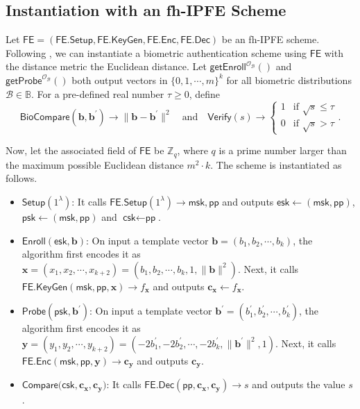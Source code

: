 
\subsection{Instantiation with an fh-IPFE Scheme}
\label{sec:fh-IPFE-instantiation}

Let $\textsf{FE} = (\textsf{FE.Setup}, \textsf{FE.KeyGen}, \textsf{FE.Enc}, \textsf{FE.Dec})$ be an fh-IPFE scheme. Following \cite{cryptoeprint:2023/481}, we can instantiate a biometric authentication scheme using $\textsf{FE}$ with the distance metric the Euclidean distance.
Let $\textsf{getEnroll}^{\mathcal{O}_{\mathcal{B}}}()$ and $\textsf{getProbe}^{\mathcal{O}_{\mathcal{B}}}()$ both output vectors in $ \{0, 1, \cdots, m \}^k$ for all biometric distributions $\mathcal{B} \in \mathbb{B}$. 
For a pre-defined real number $\tau \geq 0$, define
\[
	\textsf{BioCompare}(\mathbf{b}, \mathbf{b}^\prime) \to \| \mathbf{b} - \mathbf{b}^\prime\|^2 \quad \text{and} \quad 
	\textsf{Verify}(s) \to 
	\begin{cases} 
		1 & \text{if } \sqrt{s} \leq \tau \\
		0 & \text{if } \sqrt{s} > \tau
	\end{cases}.
\]

Now, let the associated field of $\textsf{FE}$ be $\mathbb{Z}_q$, where $q$ is a prime number larger than the maximum possible Euclidean distance $m^2 \cdot k$. The scheme is instantiated as follows.

\begin{itemize}

	\item $\textsf{Setup}(1^\lambda)$: It calls $\textsf{FE.Setup}(1^\lambda) \to \textsf{msk}, \textsf{pp}$ and outputs $\textsf{esk} \gets (\textsf{msk}, \textsf{pp})$, $\textsf{psk} \gets (\textsf{msk}, \textsf{pp})$ and $\textsf{csk} \gets \textsf{pp}$.

	\item $\textsf{Enroll}(\textsf{esk}, \mathbf{b})$: On input a template vector $\mathbf{b} = (b_1, b_2, \cdots, b_k)$, the algorithm first encodes it as $\mathbf{x} = (x_1, x_2, \cdots, x_{k+2}) = (b_1, b_2, \cdots, b_k, 1, \|\mathbf{b}\|^2)$. Next, it calls $\textsf{FE.KeyGen}(\textsf{msk}, \textsf{pp}, \mathbf{x}) \to f_\mathbf{x}$ and outputs $\mathbf{c_x} \gets f_\mathbf{x}$.

	\item $\textsf{Probe}(\textsf{psk}, \mathbf{b}^\prime)$: On input a template vector $\mathbf{b}^\prime = (b_1^\prime, b_2^\prime, \cdots, b_k^\prime)$, the algorithm first encodes it as $\mathbf{y} = (y_1, y_2, \cdots, y_{k+2}) = (-2b_1^\prime, -2b_2^\prime, \cdots, -2b_k^\prime, \|\mathbf{b}^\prime\|^2, 1)$. Next, it calls $\textsf{FE.Enc}(\textsf{msk}, \textsf{pp}, \mathbf{y}) \to \mathbf{c_y}$ and outputs $\mathbf{c_y}$.

	\item $\textsf{Compare}(\textsf{csk}, \mathbf{c_x}, \mathbf{c_y)}$: It calls $\textsf{FE.Dec}(\textsf{pp}, \mathbf{c_x}, \mathbf{c_y}) \to s$ and outputs the value $s$.

\end{itemize}

